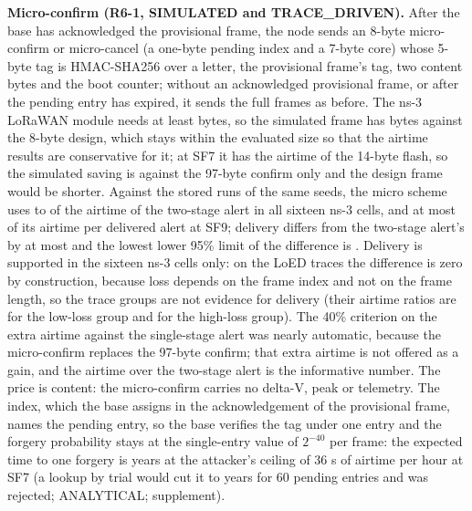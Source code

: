\documentclass{ieeeaccess}
\begin{document}
\textbf{Micro-confirm (R6-1, SIMULATED and TRACE\_DRIVEN).} After the base has acknowledged the provisional frame, the node sends an 8-byte micro-confirm or micro-cancel (a one-byte pending index and a 7-byte core) whose 5-byte tag is HMAC-SHA256 over a letter, the provisional frame's tag, two content bytes and the boot counter; without an acknowledged provisional frame, or after the pending entry has expired, it sends the full frames as before. The ns-3 LoRaWAN module needs at least \RSixNsFrameBytes{} bytes, so the simulated frame has \RSixNsFrameBytes{} bytes against the 8-byte design, which stays within the evaluated size so that the airtime results are conservative for it; at SF7 it has the airtime of the 14-byte flash, so the simulated saving is against the 97-byte confirm only and the design frame would be shorter. Against the stored runs of the same seeds, the micro scheme uses \RSixAirOverRThreeLo{} to \RSixAirOverRThreeHi{} of the airtime of the two-stage alert in all sixteen ns-3 cells, and at most \RSixNinePerDelivHi{} of its airtime per delivered alert at SF9; delivery differs from the two-stage alert's by at most \RSixDeliveryGapMax{} and the lowest lower 95\% limit of the difference is \RSixDeliveryLowerMin{}. Delivery is supported in the sixteen ns-3 cells only: on the LoED traces the difference is zero by construction, because loss depends on the frame index and not on the frame length, so the trace groups are not evidence for delivery (their airtime ratios are \RSixTraceAirLowL{} for the low-loss group and \RSixTraceAirHighH{} for the high-loss group). The 40\% criterion on the extra airtime against the single-stage alert was nearly automatic, because the micro-confirm replaces the 97-byte confirm; that extra airtime is not offered as a gain, and the airtime over the two-stage alert is the informative number. The price is content: the micro-confirm carries no delta-V, peak or telemetry. The index, which the base assigns in the acknowledgement of the provisional frame, names the pending entry, so the base verifies the tag under one entry and the forgery probability stays at the single-entry value of $2^{-40}$ per frame: the expected time to one forgery is \FrameForgeOne{} years at the attacker's ceiling of 36 s of airtime per hour at SF7 (a lookup by trial would cut it to \FrameForgeSixty{} years for 60 pending entries and was rejected; ANALYTICAL; supplement).
\end{document}
